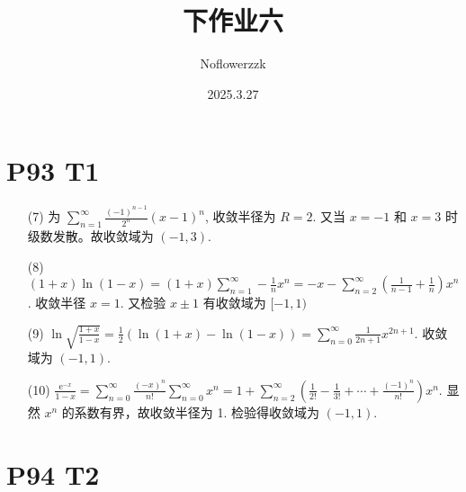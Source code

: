 \documentclass{article}
\title{下作业六}
\author{Noflowerzzk}
\date{2025.3.27}
\newcommand{\nti}{\sum_{n = 1}^{\infty}}
\begin{document}
\maketitle

\section*{P93 T1}

\begin{itemize}
    \item [(7)] 为 $\nti \frac{(-1)^{n - 1}}{2^n}(x - 1)^n$, 收敛半径为 $R = 2$. 又当 $x = -1$ 和 $x = 3$ 时级数发散。故收敛域为 $(-1, 3)$.
    \item [(8)] $(1 + x)\ln (1 - x) = (1 + x)\nti -\frac{1}{n}x^n = -x - \sum_{n = 2}^{\infty}\left(\frac{1}{n - 1} + \frac{1}{n}\right)x^n$. 收敛半径 $x = 1$. 又检验 $x \pm 1$ 有收敛域为 $[-1, 1)$
    \item [(9)] $\ln \sqrt{\frac{1 + x}{1 - x}} = \frac{1}{2}\left(\ln (1 + x) - \ln(1 - x)\right) = \sum_{n = 0}^{\infty}\frac{1}{2n + 1}x^{2n + 1}$. 收敛域为 $(-1, 1)$.
    \item [(10)] $\frac{\mathrm{e}^{-x}}{1 - x} = \sum_{n = 0}^{\infty}\frac{(-x)^n}{n!}\sum_{n = 0}^{\infty}x^n = 1 + \sum_{n = 2}^{\infty}\left(\frac{1}{2!} - \frac{1}{3!} + \cdots + \frac{(-1)^n}{n!}\right)x^n$. 显然 $x^n$ 的系数有界，故收敛半径为 1. 检验得收敛域为 $(-1, 1)$.
\end{itemize}

\section*{P94 T2}
\end{document}
